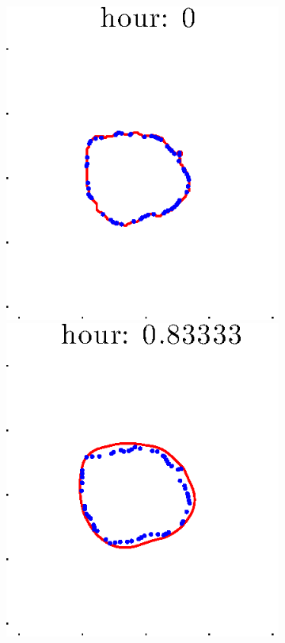 \documentclass[12pt]{article}
\begin{document}
\begin{figure}[h!]
\begin{subfigure}[b]{.3\textwidth}
	\end{subfigure}
	\begin{subfigure}[b]{.3\textwidth}
	\centering
		\includegraphics[height=.15\textheight]{Pos5exp2/firsthalf/second1.eps}
		\includegraphics[height=.15\textheight]{Pos5exp2/firsthalf/second2.eps}

\end{subfigure}
\end{figure}
\end{document}
